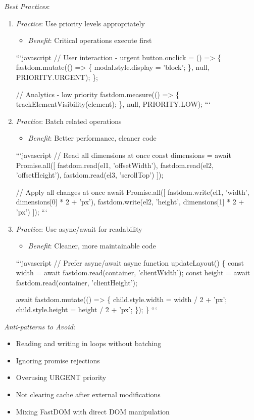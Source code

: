 \documentclass[11pt]{article}
\begin{document}
\emph{Best Practices}:

\begin{enumerate}
\item \emph{Practice}: Use priority levels appropriately
\begin{itemize}
\item \emph{Benefit}: Critical operations execute first
\end{itemize}
```javascript
// User interaction - urgent
button.onclick = () => \{
  fastdom.mutate(() => \{
    modal.style.display = 'block';
  \}, null, PRIORITY.URGENT);
\};

// Analytics - low priority
fastdom.measure(() => \{
  trackElementVisibility(element);
\}, null, PRIORITY.LOW);
```

\item \emph{Practice}: Batch related operations
\begin{itemize}
\item \emph{Benefit}: Better performance, cleaner code
\end{itemize}
```javascript
// Read all dimensions at once
const dimensions = await Promise.all([
  fastdom.read(el1, 'offsetWidth'),
  fastdom.read(el2, 'offsetHeight'),
  fastdom.read(el3, 'scrollTop')
]);

// Apply all changes at once
await Promise.all([
  fastdom.write(el1, 'width', dimensions[0] * 2 + 'px'),
  fastdom.write(el2, 'height', dimensions[1] * 2 + 'px')
]);
```

\item \emph{Practice}: Use async/await for readability
\begin{itemize}
\item \emph{Benefit}: Cleaner, more maintainable code
\end{itemize}
```javascript
// Prefer async/await
async function updateLayout() \{
  const width = await fastdom.read(container, 'clientWidth');
  const height = await fastdom.read(container, 'clientHeight');

  await fastdom.mutate(() => \{
    child.style.width = width / 2 + 'px';
    child.style.height = height / 2 + 'px';
  \});
\}
```
\end{enumerate}

\emph{Anti-patterns to Avoid}:

\begin{itemize}
\item Reading and writing in loops without batching
\item Ignoring promise rejections
\item Overusing URGENT priority
\item Not clearing cache after external modifications
\item Mixing FastDOM with direct DOM manipulation
\end{itemize}
\end{document}
